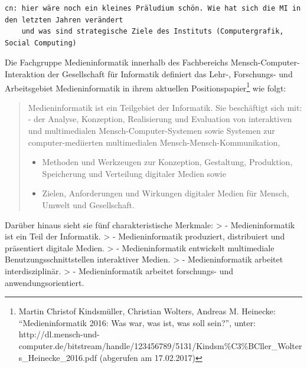 \begin{verbatim}
cn: hier wäre noch ein kleines Präludium schön. Wie hat sich die MI in den letzten Jahren verändert
    und was sind strategische Ziele des Instituts (Computergrafik, Social Computing)
\end{verbatim}

Die Fachgruppe Medieninformatik innerhalb des Fachbereichs
Mensch-Computer-Interaktion der Gesellschaft für Informatik definiert
das Lehr-, Forschungs- und Arbeitsgebiet Medieninformatik in ihrem
aktuellen Positionspapier\footnote{Martin Christof Kindsmüller,
  Christian Wolters, Andreas M. Heinecke: ``Medieninformatik 2016: Was
  war, was ist, was soll sein?'', unter:
  http://dl.mensch-und-computer.de/bitstream/handle/123456789/5131/Kindsm\%C3\%BCller\_Wolters\_Heinecke\_2016.pdf
  (abgerufen am 17.02.2017)} wie folgt:

\begin{quote}
Medieninformatik ist ein Teilgebiet der Informatik. Sie beschäftigt sich
mit: - der Analyse, Konzeption, Realisierung und Evaluation von
interaktiven und multimedialen Mensch-Computer-Systemen sowie Systemen
zur computer-mediierten multimedialen Mensch-Mensch-Kommunikation,

\begin{itemize}
\tightlist
\item
  Methoden und Werkzeugen zur Konzeption, Gestaltung, Produktion,
  Speicherung und Verteilung digitaler Medien sowie
\item
  Zielen, Anforderungen und Wirkungen digitaler Medien für Mensch,
  Umwelt und Gesellschaft.
\end{itemize}
\end{quote}

Darüber hinaus sieht sie fünf charakteristische Merkmale: \textgreater{}
- Medieninformatik ist ein Teil der Informatik. \textgreater{} -
Medieninformatik produziert, distribuiert und präsentiert digitale
Medien. \textgreater{} - Medieninformatik entwickelt multimediale
Benutzungsschnittstellen interaktiver Medien. \textgreater{} -
Medieninformatik arbeitet interdisziplinär. \textgreater{} -
Medieninformatik arbeitet forschungs- und anwendungsorientiert.

